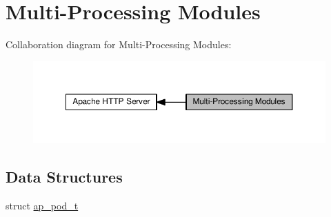 \hypertarget{group__APACHE__MPM}{}\section{Multi-\/\+Processing Modules}
\label{group__APACHE__MPM}
Collaboration diagram for Multi-\/\+Processing Modules\+:
\nopagebreak
\begin{figure}[H]
\begin{center}
\leavevmode
\includegraphics[width=350pt]{group__APACHE__MPM}
\end{center}
\end{figure}
\subsection*{Data Structures}
\begin{DoxyCompactItemize}
\item 
struct \hyperlink{structap__pod__t}{ap\+\_\+pod\+\_\+t}
\end{DoxyCompactItemize}
